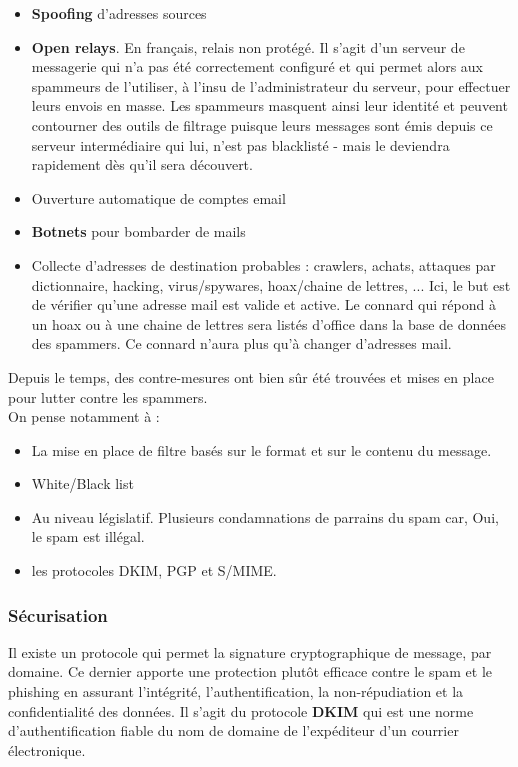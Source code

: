 \documentclass{report}
\begin{document}
\begin{itemize}
    \item \textbf{Spoofing} d'adresses sources
    \item \textbf{Open relays}. En français, relais non protégé. Il s'agit d'un serveur de messagerie qui n'a pas été correctement configuré et qui permet alors aux spammeurs de l'utiliser, à l'insu de l'administrateur du serveur, pour effectuer leurs envois en masse. Les spammeurs masquent ainsi leur identité et peuvent contourner des outils de filtrage puisque leurs messages sont émis depuis ce serveur intermédiaire qui lui, n'est pas blacklisté - mais le deviendra rapidement dès qu'il sera découvert.
    \item Ouverture automatique de comptes email
    \item \textbf{Botnets} pour bombarder de mails
    \item Collecte d'adresses de destination probables : crawlers, achats, attaques par dictionnaire, hacking, virus/spywares, hoax/chaine de lettres, ... Ici, le but est de vérifier qu'une adresse mail est valide et active. Le connard qui répond à un hoax ou à une chaine de lettres sera listés d'office dans la base de données des spammers. Ce connard n'aura plus qu'à changer d'adresses mail.
\end{itemize}

Depuis le temps, des contre-mesures ont bien sûr été trouvées et mises en place pour lutter contre les spammers. \\
On pense notamment à :

\begin{itemize}
    \item La mise en place de filtre basés sur le format et sur le contenu du message.
    \item White/Black list
    \item Au niveau législatif. Plusieurs condamnations de parrains du spam car, Oui, le spam est illégal.
    \item les protocoles DKIM, PGP et S/MIME.
\end{itemize}

\subsubsection{Sécurisation}

Il existe un protocole qui permet la signature cryptographique de message, par domaine. Ce dernier apporte une protection plutôt efficace contre le spam et le phishing en assurant l'intégrité, l'authentification, la non-répudiation et la confidentialité des données. Il s'agit du protocole \textbf{DKIM} qui est une norme d'authentification fiable du nom de domaine de l'expéditeur d'un courrier électronique.\\
\end{document}
